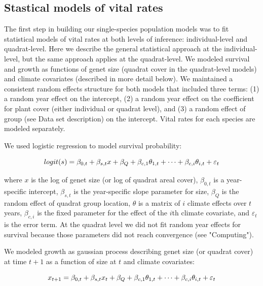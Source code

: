 \documentclass[12pt]{article}
\begin{document}
\subsection{Stastical models of vital rates}
The first step in building our single-species population models was to fit statistical models of vital rates at both levels of inference: individual-level and quadrat-level. Here we describe the general statistical approach at the individual-level, but the same approach applies at the quadrat-level. We modeled survival and growth as functions of genet size (quadrat cover in the quadrat-level models) and climate covariates (described in more detail below). We maintained a consistent random effects structure for both models that included three terms: (1) a random year effect on the intercept, (2) a random year effect on the coefficient for plant cover (either individual or quadrat level), and (3) a random effect of group (see Data set description) on the intercept. Vital rates for each species are modeled separately.

We used logistic regression to model survival probability:

\begin{equation}
logit(s) = \beta_{0,t} + \beta_{s,t}x + \beta_{Q} + \beta_{c,1}\theta_{1,t}\\
+ \cdots +  \beta_{c,i}\theta_{i,t} + \varepsilon_{t}
\end{equation}

\noindent where $x$ is the log of genet size (or log of quadrat areal cover), $\beta_{0,t}$ is a year-specific intercept, $\beta_{s,t}$ is the year-specific slope parameter for size, $\beta_{Q}$ is the random effect of quadrat group location, $\theta$ is a matrix of $i$ climate effects over $t$ years, $\beta_{c,i}$ is the fixed parameter for the effect of the $i$th climate covariate, and $\varepsilon_{t}$ is the error term. At the quadrat level we did not fit random year effects for survival because those parameters did not reach convergence (see "Computing").

We modeled growth as gaussian process describing genet size (or quadrat cover) at time $t+1$ as a function of size at $t$ and climate covariates:

\begin{equation}
x_{t+1} = \beta_{0,t} + \beta_{s,t}x_{t} + \beta_{Q} + \beta_{c,1}\theta_{1,t}\\
+ \cdots +  \beta_{c,i}\theta_{i,t} + \varepsilon_{t}
\end{equation}
\end{document}
